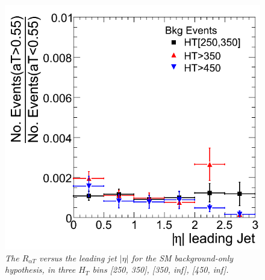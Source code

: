 \begin{figure}[h!]
\centering
\includegraphics[scale=0.38]{./plots/RaT-Bkg.png}
\caption{\textit{The $R_{\alpha T}$ versus the leading jet $|\eta|$ for the SM background-only hypothesis, in three $H_{T}$ bins [250, 350], [350, inf], [450, inf].} }
\label{fig:id1}
\end{figure}


